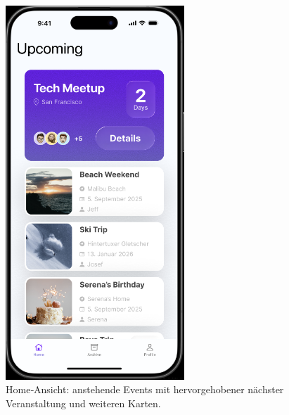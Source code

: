 \documentclass[11pt,a4paper]{article}
\begin{document}
\begin{figure}[h]
  \centering
  \includegraphics[width=0.6\textwidth]{image-3.png}
  \caption{Home‑Ansicht: anstehende Events mit hervorgehobener nächster Veranstaltung und weiteren Karten.}
  \label{fig:home}
\end{figure}
\end{document}
